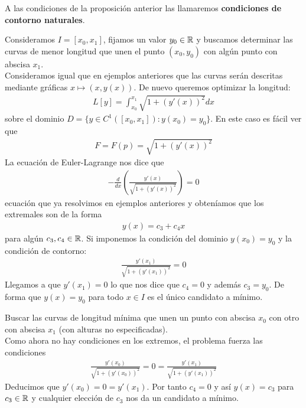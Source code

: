 \begin{definicion}
    A las condiciones de la proposición anterior las llamaremos \textbf{condiciones de contorno naturales}.
\end{definicion}

\begin{ejemplo}
    Consideramos $I=[x_0, x_1]$, fijamos un valor $y_0\in \mathbb{R}$ y buscamos determinar las curvas de menor longitud que unen el punto $(x_0, y_0)$ con algún punto con abscisa $x_1$.\\

    Consideramos igual que en ejemplos anteriores que las curvas serán descritas mediante gráficas $x\mapsto (x,y(x))$. De nuevo queremos optimizar la longitud:
    \begin{gather*}
        L[y] = \int_{x_0}^{x_1} \sqrt{1+(y'(x))^2} dx
    \end{gather*}
    sobre el dominio $D=\{y\in C^1([x_0, x_1]) : y(x_0)=y_0\}$. En este caso es fácil ver que 
    \begin{gather*}
        F=F(p)= \sqrt{1+(y'(x))^2}
    \end{gather*}
    La ecuación de Euler-Lagrange nos dice que
    \begin{gather*}
        -\frac{d}{dx} \left(\frac{y'(x)}{\sqrt{1+(y'(x))^2}}\right) = 0
    \end{gather*}
    ecuación que ya resolvimos en ejemplos anteriores y obteníamos que los extremales son de la forma 
    \begin{gather*}
        y(x) = c_3 + c_4x
    \end{gather*}
    para algún $c_3, c_4\in \mathbb{R}$. Si imponemos la condición del dominio $y(x_0)=y_0$ y la condición de contorno:
    \begin{gather*}
        \frac{y'(x_1)}{\sqrt{1+(y'(x_1))^2}} = 0
    \end{gather*}
    Llegamos a que $y'(x_1) = 0$ lo que nos dice que $c_4=0$ y además $c_3=y_0$. De forma que $y(x) = y_0$ para todo $x\in I$ es el único candidato a mínimo.
\end{ejemplo}

\begin{ejemplo}
    Buscar las curvas de longitud mínima que unen un punto con abscisa $x_0$ con otro con abscisa $x_1$ (con alturas no especificadas).\\

    Como ahora no hay condiciones en los extremos, el problema fuerza las condiciones
    \begin{gather*}
        \frac{y'(x_0)}{\sqrt{1+(y'(x_0))^2}} = 0 = \frac{y'(x_1)}{\sqrt{1+(y'(x_1))^2}}
    \end{gather*}
    Deducimos que $y'(x_0) = 0 = y'(x_1)$. Por tanto $c_4=0$ y así $y(x)=c_3$ para $c_3\in \mathbb{R}$ y cualquier elección de $c_3$ nos da un candidato a mínimo.
\end{ejemplo}


